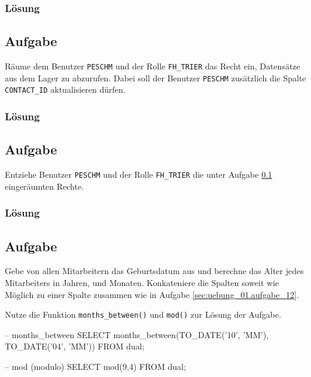\subsubsection*{Lösung}
\label{sec:uebung_03.aufgabe_06.loesung}

\subsection{Aufgabe}
\label{sec:uebung_03.aufgabe_07}
Räume dem Benutzer \texttt{PESCHM} und der Rolle \texttt{FH\_TRIER} das Recht ein, Datensätze aus dem Lager zu abzurufen. Dabei soll der Benutzer \texttt{PESCHM} zusätzlich die Spalte \texttt{CONTACT\_ID} aktualisieren dürfen.

\subsubsection*{Lösung}
\label{sec:uebung_03.aufgabe_07.loesung}

\subsection{Aufgabe}
\label{sec:uebung_03.aufgabe_08}
Entziehe Benutzer \texttt{PESCHM} und der Rolle \texttt{FH\_TRIER} die unter Aufgabe \ref{sec:uebung_03.aufgabe_07} eingeräumten Rechte.

\subsubsection*{Lösung}
\label{sec:uebung_03.aufgabe_08.loesung}

\subsection{Aufgabe}
\label{sec:uebung_03.aufgabe_09}
Gebe von allen Mitarbeitern das Geburtsdatum aus und berechne das Alter jedes Mitarbeiters in Jahren, und Monaten. Konkateniere die Spalten soweit wie Möglich zu einer Spalte zusammen wie in Aufgabe \ref{sec:uebung_01.aufgabe_12}.

\begin{info-popup}
  Nutze die Funktion \texttt{months\_between()} und \texttt{mod()} zur Lösung der Aufgabe.

  \begin{sqlcode}
    -- months_between
    SELECT months_between(TO_DATE('10', 'MM'), TO_DATE('04', 'MM'))
    FROM dual;

    -- mod (modulo)
    SELECT mod(9,4)
    FROM dual;
  \end{sqlcode}
\end{info-popup}

